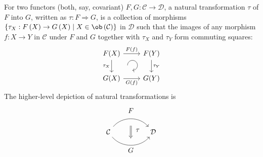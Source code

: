 \begin{defn}
    For two functors (both, say, covariant) $F,G:\mathcal{C}\to\mathcal{D}$,
    a natural transformation $\tau$ of $F$ into $G$, written as $\tau:F\Longrightarrow G$,
    is a collection of morphisms $\left\{ \tau_{X}:F\left(X\right)\to G\left(X\right)\mid X\in\ob\left(\mathcal{C}\right)\right\} $
    in $\mathcal{D}$ such that the images of any morphism $f:X\to Y$
    in $\mathcal{C}$ under $F$ and $G$ together with $\tau_{X}$ and
    $\tau_{Y}$ form commuting squares:
    \[\begin{tikzcd}[every matrix/.append style={name=m},   
    execute at end picture={\draw [<-] ([xshift=-2.7em,yshift=1mm]m-2-2.north) arc[start angle=-90,delta angle=270,radius=0.25cm];}]
    F(X) \arrow[r,"F(f)"]\arrow[d,swap,"\tau_X"]& F(Y)\arrow[d,"\tau_Y"] \\
    G(X)\arrow[r,swap,"G(f)"]& G(Y)
    \end{tikzcd}\]
    The higher-level depiction of natural transformations is \[\begin{tikzcd}[column sep=huge]
    \mathcal{C}   \arrow[bend left=50]{r}[name=U,label=above:$F$]{}   \arrow[bend right=50]{r}[name=D,label=below:$G$]{} & \mathcal D   \arrow[shorten <=10pt,shorten >=5pt,Rightarrow,to path={(U) -- node[label=right:$\tau$] {} (D)}]{} 
    \end{tikzcd}\]
\end{defn}
